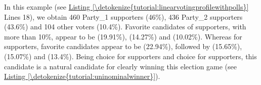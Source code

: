 \documentclass[a4paper,12pt,english]{sphinxhowto}
\begin{document}
In this example (see \hyperref[\detokenize{tutorial:linearvotingprofilewithpolls}]{Listing \ref{\detokenize{tutorial:linearvotingprofilewithpolls}}} Lines 18\sphinxhyphen{}), we obtain 460 Party\_1 supporters (46\%), 436 Party\_2 supporters (43.6\%) and 104 other voters (10.4\%). Favorite candidates of  supporters, with more than 10\%, appear to be  (19.91\%),  (14.27\%) and  (10.02\%). Whereas for  supporters, favorite candidates appear to be  (22.94\%), followed by  (15.65\%),  (15.07\%) and  (13.4\%). Being  choice for  supporters and  choice for  supporters, this candidate  is a natural candidate for clearly winning this election game (see \hyperref[\detokenize{tutorial:uninominalwinner}]{Listing \ref{\detokenize{tutorial:uninominalwinner}}}).
\def\sphinxLiteralBlockLabel{\label{\detokenize{tutorial:uninominalwinner}}}
\begin{sphinxVerbatim}[commandchars=\\\{\},numbers=left,firstnumber=1,stepnumber=1]
\end{sphinxVerbatim}
\end{document}
